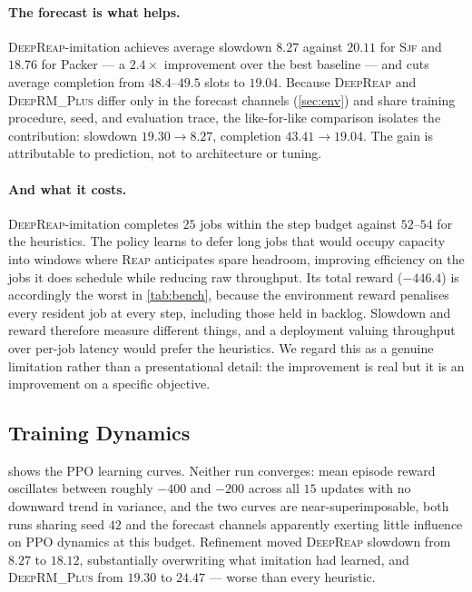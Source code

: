 \documentclass{svproc}
\newcommand{\reap}{\textsc{Reap}}
\newcommand{\deeprm}{\textsc{DeepRM\_Plus}}
\newcommand{\deepreap}{\textsc{DeepReap}}
\newcommand{\sjf}{\textsc{Sjf}}
\begin{document}
\paragraph{The forecast is what helps.} \deepreap{}-imitation achieves
average slowdown $8.27$ against $20.11$ for \sjf{} and $18.76$ for
Packer --- a $2.4\times$ improvement over the best baseline --- and cuts
average completion from $48.4$--$49.5$ slots to $19.04$. Because
\deepreap{} and \deeprm{} differ only in the forecast channels
(\cref{sec:env}) and share training procedure, seed, and evaluation
trace, the like-for-like comparison isolates the contribution: slowdown
$19.30\to8.27$, completion $43.41\to19.04$. The gain is attributable to
prediction, not to architecture or tuning.

\paragraph{And what it costs.} \deepreap{}-imitation completes $25$
jobs within the step budget against $52$--$54$ for the heuristics. The
policy learns to defer long jobs that would occupy capacity into
windows where \reap{} anticipates spare headroom, improving efficiency
on the jobs it does schedule while reducing raw throughput. Its total
reward ($-446.4$) is accordingly the worst in \cref{tab:bench}, because
the environment reward penalises every resident job at every step,
including those held in backlog. Slowdown and reward therefore measure
different things, and a deployment valuing throughput over per-job
latency would prefer the heuristics. We regard this as a genuine
limitation rather than a presentational detail: the improvement is real
but it is an improvement on a specific objective.

\subsection{Training Dynamics}\label{sec:dynamics}
 shows the PPO learning curves. Neither run converges:
mean episode reward oscillates between roughly $-400$ and $-200$ across
all $15$ updates with no downward trend in variance, and the two curves
are near-superimposable, both runs sharing seed $42$ and the forecast
channels apparently exerting little influence on PPO dynamics at this
budget. Refinement moved \deepreap{} slowdown from $8.27$ to $18.12$,
substantially overwriting what imitation had learned, and \deeprm{}
from $19.30$ to $24.47$ --- worse than every heuristic.
\end{document}
